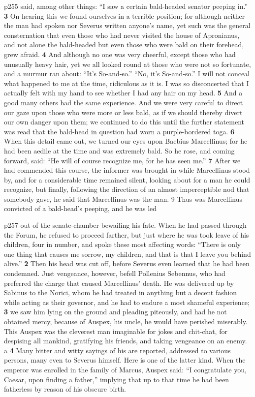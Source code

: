 p255 said, among other things: ``I saw a certain bald-headed senator peeping in.'' \textbf{3} On hearing this we found ourselves in a terrible position; for although neither the man had spoken nor Severus written anyone's name, yet such was the general consternation that even those who had never visited the house of Apronianus, and not alone the bald-headed but even those who were bald on their forehead, grew afraid. \textbf{4} And although no one was very cheerful, except those who had unusually heavy hair, yet we all looked round at those who were not so fortunate, and a murmur ran about: ``It's So-and\texthebrew{‑}so.'' ``No, it's So-and\texthebrew{‑}so.'' I will not conceal what happened to me at the time, ridiculous as it is. I was so disconcerted that I actually felt with my hand to see whether I had any hair on my head. \textbf{5} And a good many others had the same experience. And we were very careful to direct our gaze upon those who were more or less bald, as if we should thereby divert our own danger upon them; we continued to do this until the further statement was read that the bald-head in question had worn a purple-bordered toga. \textbf{6} When this detail came out, we turned our eyes upon Baebius Marcellinus; for he had been aedile at the time and was extremely bald. So he rose, and coming forward, said: ``He will of course recognize me, for he has seen me.'' \textbf{7} After we had commended this course, the informer was brought in while Marcellinus stood by, and for a considerable time remained silent, looking about for a man he could recognize, but finally, following the direction of an almost imperceptible nod that somebody gave, he said that Marcellinus was the man. 9 Thus was Marcellinus convicted of a bald-head's peeping, and he was led

p257 out of the senate-chamber bewailing his fate. When he had passed through the Forum, he refused to proceed farther, but just where he was took leave of his children, four in number, and spoke these most affecting words: ``There is only one thing that causes me sorrow, my children, and that is that I leave you behind alive.'' \textbf{2} Then his head was cut off, before Severus even learned that he had been condemned. Just vengeance, however, befell Pollenius Sebennus, who had preferred the charge that caused Marcellinus' death. He was delivered up by Sabinus to the Norici, whom he had treated in anything but a decent fashion while acting as their governor, and he had to endure a most shameful experience; \textbf{3} we saw him lying on the ground and pleading piteously, and had he not obtained mercy, because of Auspex, his uncle, he would have perished miserably. This Auspex was the cleverest man imaginable for jokes and chit-chat, for despising all mankind, gratifying his friends, and taking vengeance on an enemy.\texthebrew{⁠} a \textbf{4} Many bitter and witty sayings of his are reported, addressed to various persons, many even to Severus himself. Here is one of the latter kind. When the emperor was enrolled in the family of Marcus, Auspex said: ``I congratulate you, Caesar, upon finding a father,'' implying that up to that time he had been fatherless by reason of his obscure birth.

